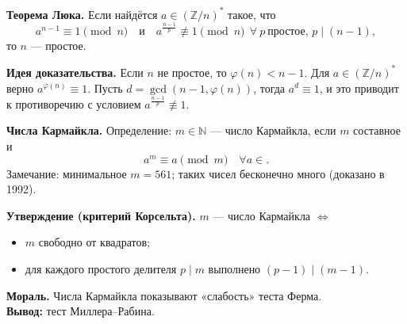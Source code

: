 \documentclass[12pt,a4paper]{article}
\newcommand{\Z}{\mathbb{Z}}
\DeclareMathOperator{\gcdop}{gcd}
\begin{document}
\textbf{Теорема Люка.}
Если найдётся $a\in(\Z/n)^{\ast}$ такое, что
\[
a^{n-1}\equiv 1\pmod n
\quad\text{и}\quad
a^{\frac{n-1}{p}}\not\equiv 1\pmod n\ \ \forall\ p\ \text{простое, }p\mid(n-1),
\]
то $n$ — простое.

\textbf{Идея доказательства.}
Если $n$ не простое, то $\varphi(n)<n-1$.
Для $a\in(\Z/n)^{\ast}$ верно $a^{\varphi(n)}\equiv 1$.
Пусть $d=\gcdop(n-1,\varphi(n))$, тогда $a^d\equiv 1$, и это приводит к противоречию
с условием $a^{\frac{n-1}{p}}\not\equiv 1$.

\textbf{Числа Кармайкла.}
Определение: $m\in \mathbb{N}$ — число Кармайкла, если $m$ составное и
\[
a^m \equiv a \pmod m \quad \forall a\in.
\]
Замечание: минимальное $m=561$; таких чисел бесконечно много (доказано в 1992).

\textbf{Утверждение (критерий Корсельта).}
$m$ — число Кармайкла $\iff$
\begin{itemize}
  \item $m$ свободно от квадратов;
  \item для каждого простого делителя $p\mid m$ выполнено $(p-1)\mid(m-1)$.
\end{itemize}

\textbf{Мораль.}
Числа Кармайкла показывают «слабость» теста Ферма.\\
\textbf{Вывод:} тест Миллера--Рабина.
\end{document}
